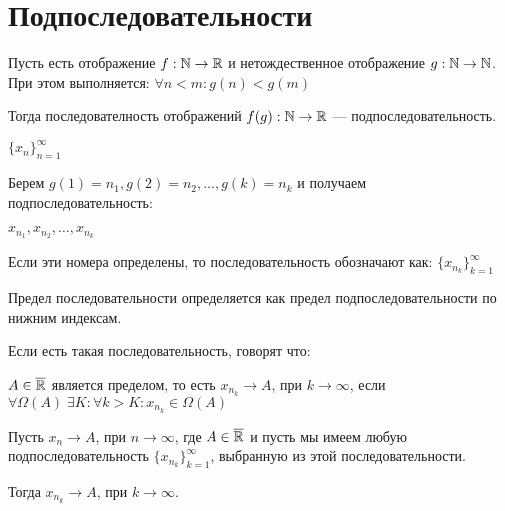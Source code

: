 \section{Подпоследовательности}

\begin{definition}
    
    Пусть есть отображение $f: \mathbb{N} \to \mathbb{R}$ и нетождественное отображение $g: \mathbb{N} \to \mathbb{N}$. При этом выполняется: $\forall n < m: g(n) < g(m)$

    Тогда последователность отображений $f(g): \mathbb{N} \to \mathbb{R}$ --- подпоследовательность.
\end{definition}


\begin{note}
    $\{x_n\}_{n=1}^\infty$

    Берем $g(1) = n_1, g(2) = n_2, \ldots, g(k) = n_k$ и получаем подпоследовательность:

    $x_{n_1}, x_{n_2}, \ldots, x_{n_k}$
\end{note}

\begin{notation}
    Если эти номера определены, то последовательность обозначают как: $\{x_{n_k}\}_{k=1}^\infty$
\end{notation}


\begin{definition}
    Предел последовательности определяется как предел подпоследовательности по нижним индексам.

    Если есть такая последовательность, говорят что:

    $ A \in \overline{\mathbb{R}} $ является пределом, то есть $x_{n_k} \to A$, при $k \to \infty$, если $\forall \Omega (A) \; \exists K: \forall k > K: x_{n_k} \in \Omega(A)$
    
\end{definition}


\begin{theorem}
    Пусть $x_n \to A$, при $n \to \infty$, где $A \in \overline {\mathbb{R}}$ и пусть мы имеем любую подпоследовательность $\{x_{n_k}\}_{k=1}^\infty$, выбранную из этой последовательности. 

    Тогда $x_{n_k} \to A$, при $k \to \infty$.
\end{theorem}

